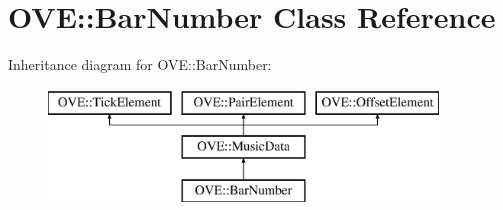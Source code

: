 \hypertarget{class_o_v_e_1_1_bar_number}{}\section{O\+VE\+:\+:Bar\+Number Class Reference}
\label{class_o_v_e_1_1_bar_number}
Inheritance diagram for O\+VE\+:\+:Bar\+Number\+:\begin{figure}[H]
\begin{center}
\leavevmode
\includegraphics[height=3.000000cm]{class_o_v_e_1_1_bar_number}
\end{center}
\end{figure}
